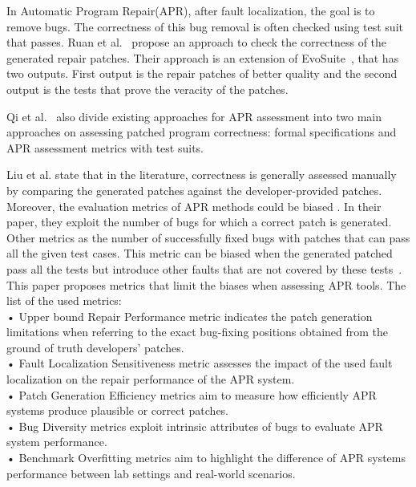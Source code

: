 In Automatic Program Repair(APR), after fault localization, the goal is to remove bugs. The correctness of this bug removal is often checked using test suit that passes.
Ruan et al.~\cite{10638555} propose an approach to check the correctness of the generated repair patches. Their approach is an extension of EvoSuite~\cite{fraser2011evosuite}, that has two outputs. First output is the repair patches of better quality and the second output is the tests that prove the veracity of the patches.



Qi et al.~\cite{8612557} also divide existing approaches for APR assessment into two main approaches on assessing patched program correctness: formal specifications and APR assessment metrics with test suits.

Liu et al. \cite{LIU2021110817} state that in the literature, correctness is generally assessed manually by comparing the generated patches against the developer-provided patches. Moreover, the evaluation metrics of APR methods could be biased \cite{LIU2021110817}. In their paper, they exploit the number of bugs for which a correct patch is generated. Other metrics as the number of successfully fixed bugs with patches that can pass all the given test cases. This metric can be biased when the generated patched pass all the tests but introduce other faults that are not covered by these tests~\cite{LIU2021110817}.
 This paper proposes metrics that limit the biases when assessing APR tools. The list of the used metrics:\\
•  Upper bound Repair Performance metric indicates the patch generation limitations when referring to the exact bug-fixing positions obtained from the ground of truth developers’ patches. 
\\
• Fault Localization Sensitiveness metric assesses the impact of the used fault localization on the repair performance of the APR system.\\
• Patch Generation Efficiency metrics aim to measure how efficiently APR systems produce plausible or correct patches.\\
• Bug Diversity metrics exploit intrinsic attributes of bugs to evaluate APR system performance.\\
• Benchmark Overfitting metrics aim to highlight the difference of APR systems performance between lab settings and real-world scenarios.

